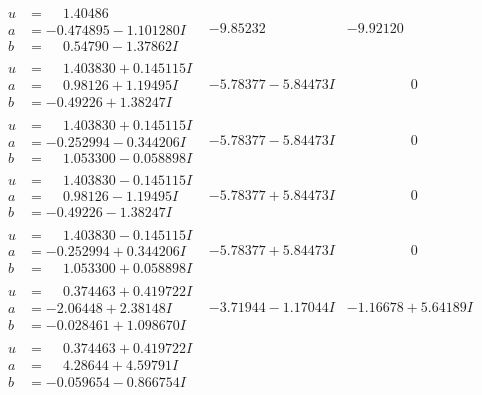 \documentclass[1p]{elsarticle_modified}
\theoremstyle{definition}
\begin{document}
$$\begin{array}{c|c|c}
\begin{aligned}
u &= \phantom{-}1.40486\phantom{ +0.000000I} \\
a &= -0.474895 - 1.101280 I \\
b &= \phantom{-}0.54790 - 1.37862 I\end{aligned}
 & -9.85232\phantom{ +0.000000I} & -9.92120\phantom{ +0.000000I} \\ \hline\begin{aligned}
u &= \phantom{-}1.403830 + 0.145115 I \\
a &= \phantom{-}0.98126 + 1.19495 I \\
b &= -0.49226 + 1.38247 I\end{aligned}
 & -5.78377 - 5.84473 I & \phantom{-0.000000 } 0 \\ \hline\begin{aligned}
u &= \phantom{-}1.403830 + 0.145115 I \\
a &= -0.252994 - 0.344206 I \\
b &= \phantom{-}1.053300 - 0.058898 I\end{aligned}
 & -5.78377 - 5.84473 I & \phantom{-0.000000 } 0 \\ \hline\begin{aligned}
u &= \phantom{-}1.403830 - 0.145115 I \\
a &= \phantom{-}0.98126 - 1.19495 I \\
b &= -0.49226 - 1.38247 I\end{aligned}
 & -5.78377 + 5.84473 I & \phantom{-0.000000 } 0 \\ \hline\begin{aligned}
u &= \phantom{-}1.403830 - 0.145115 I \\
a &= -0.252994 + 0.344206 I \\
b &= \phantom{-}1.053300 + 0.058898 I\end{aligned}
 & -5.78377 + 5.84473 I & \phantom{-0.000000 } 0 \\ \hline\begin{aligned}
u &= \phantom{-}0.374463 + 0.419722 I \\
a &= -2.06448 + 2.38148 I \\
b &= -0.028461 + 1.098670 I\end{aligned}
 & -3.71944 - 1.17044 I & -1.16678 + 5.64189 I \\ \hline\begin{aligned}
u &= \phantom{-}0.374463 + 0.419722 I \\
a &= \phantom{-}4.28644 + 4.59791 I \\
b &= -0.059654 - 0.866754 I\end{aligned}

\end{array}$$
\end{document}
